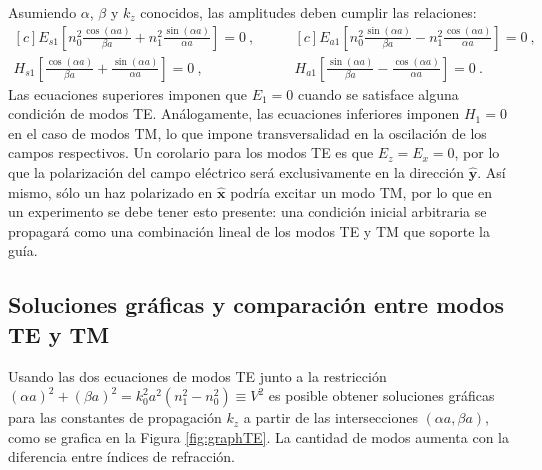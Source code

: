Asumiendo $\alpha$, $\beta$ y $k_z$ conocidos, las amplitudes deben cumplir las relaciones:
\begin{equation*}
	\begin{aligned}[c]
	E_{s1} \left[n_0^2 \frac{\cos(\alpha a)}{\beta a}+n_1 ^2 \frac{\sin(\alpha a)}{\alpha a}\right] = 0 \ ,
		\\
	H_{s1} \left[\frac{\cos(\alpha a)}{\beta a} + \frac{\sin(\alpha a)}{\alpha a} \right] = 0 \ ,
\end{aligned} 
\quad\quad
	\begin{aligned}[c]
	E_{a1} \left[ n_0^2\frac{\sin(\alpha a)}{\beta a} - n_1^2\frac{\cos(\alpha a)}{\alpha a}\right] = 0 \ ,
		\\
	H_{a1} \left[ \frac{\sin(\alpha a)}{\beta a} - \frac{\cos(\alpha a)}{\alpha a}\right] = 0 \ .
\end{aligned} 
\end{equation*}
Las ecuaciones superiores imponen que $E_1 = 0$ cuando se satisface alguna condición de modos TE. Análogamente, las ecuaciones inferiores imponen $H_1 = 0$ en el caso de modos TM, lo que impone transversalidad en la oscilación de los campos respectivos.
Un corolario para los modos TE es que $E_z = E_x = 0$, por lo que la polarización del campo eléctrico será exclusivamente en la dirección $\hat{\textbf{y}}$. Así mismo, sólo un haz polarizado en $\hat{\textbf{x}}$ podría excitar un modo TM, por lo que en un experimento se debe tener esto presente: una condición inicial arbitraria se propagará como una combinación lineal de los modos TE y TM que soporte la guía.

\subsection{Soluciones gráficas y comparación entre modos TE y TM \label{cap:solslabTETM}}

Usando las dos ecuaciones de modos TE junto a la restricción $(\alpha a)^2 + (\beta a)^2 = k_0^2 a^2(n_1^2 - n_0^2) \equiv V^2$ es posible obtener soluciones gráficas para las constantes de propagación $k_z$ a partir de las intersecciones $(\alpha a, \beta a)$, como se grafica en la Figura \ref{fig:graphTE}. La cantidad de modos aumenta con la diferencia entre índices de refracción.


